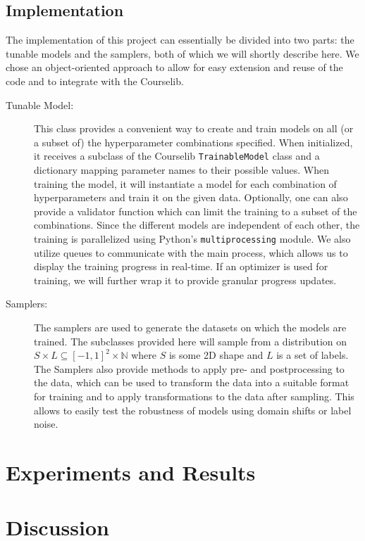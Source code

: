 \documentclass[11pt]{article}
\begin{document}
\subsection{Implementation}
The implementation of this project can essentially be divided into two parts: the tunable models and the samplers, both of which we will shortly describe here. We chose an object-oriented approach
to allow for easy extension and reuse of the code and to integrate with the Courselib.
\begin{description}
    \item[Tunable Model:] This class provides a convenient way to create and train models on all (or a subset of) the hyperparameter combinations specified. When initialized, it receives
        a subclass of the Courselib \texttt{TrainableModel} class and a dictionary mapping parameter names to their possible values. When training the model, it will instantiate a model
        for each combination of hyperparameters and train it on the given data. Optionally, one can also provide a validator function which can limit the training to a subset of the
        combinations. Since the different models are independent of each other, the training is parallelized using Python's \texttt{multiprocessing} module. We also utilize queues to
        communicate with the main process, which allows us to display the training progress in real-time. If an optimizer is used for training, we will further wrap it to provide
        granular progress updates.
    \item[Samplers:] The samplers are used to generate the datasets on which the models are trained. The subclasses provided here will sample from a distribution on $S\times L\subseteq [-1, 1]^2\times \mathbb{N}$
        where $S$ is some 2D shape and $L$ is a set of labels. The Samplers also provide methods to apply pre- and postprocessing to the data, which can be used to transform the data into a suitable format for training
        and to apply transformations to the data after sampling. This allows to easily test the robustness of models using domain shifts or label noise.
\end{description}

\section{Experiments and Results}



\section{Discussion}
\end{document}

